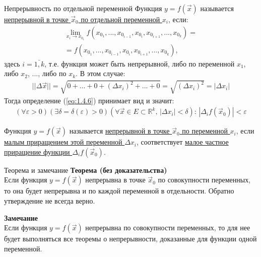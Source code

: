 \begin{tbox}{Непрерывность по отдельной переменной}
	Функция $y = f(\vec{x})$ называется \uline{непрерывной в точке $\vec{x}_0$ по отдельной переменной $x_i$}, если:
	\begin{multline} \label{eq:1.4.9}
		\lim_{x_i \to x_\text{$0_i$}} f(x_\text{$0_1$}, ..., x_\text{$0_{i-1}$}, x_\text{$0_i$}, x_\text{$0_{i+1}$}, ..., x_\text{$0_k$}) =\\= f(x_\text{$0_1$}, ..., x_\text{$0_{i-1}$}, x_\text{$0_i$}, x_\text{$0_{i+1}$}, ..., x_\text{$0_k$}),
	\end{multline}
	здесь $i = \bar{1, k}$, т.е. функция может быть непрерывной, либо по переменной $x_1$, либо $x_2$, ..., либо по $x_k$. В этом случае:
	\begin{align}
		||\Delta \vec{x}|| = \sqrt{0 + ... + 0 + (\Delta x_i)^2 + ... + 0} = \sqrt{(\Delta x_i)^2} = |\Delta x_i|
		\label{eq:1.4.10}
	\end{align}
	Тогда определение (\ref{eq:1.4.6}) принимает вид и значит:
	\begin{align}
		(\forall \varepsilon > 0)(\exists \delta = \delta(\varepsilon) > 0)(\forall \vec{x} \in E \subset \mathbb{R}^k, \, |\Delta x_i| < \delta): \, |\Delta_i f(\vec{x}_0)| < \varepsilon
		\label{eq:1.4.11}
	\end{align}

	Функция $y=f(\vec{x})$ называется \uline{непрерывной в точке $\vec{x}_0$ по переменной $x_i$}, если \uline{малым приращением этой переменной $\Delta x_i$}, соответствует \uline{малое частное приращение функции $\Delta_i f(\vec{x}_0)$}.
\end{tbox}

\begin{tbox}{Теорема и замечание}
	\textbf{Теорема (без доказательства)} \\
	Если функция $y=f(\vec{x})$ непрерывна в точке $\vec{x}_0$ по совокупности переменных, то она будет непрерывна и по каждой переменной в отдельности. Обратно утверждение не всегда верно.

	\textbf{Замечание} \\
	Если функция $y = f(\vec{x})$ непрерывна по совокупности переменных, то для нее будет выполняться все теоремы о непрерывности, доказанные для функции одной переменной.
\end{tbox}